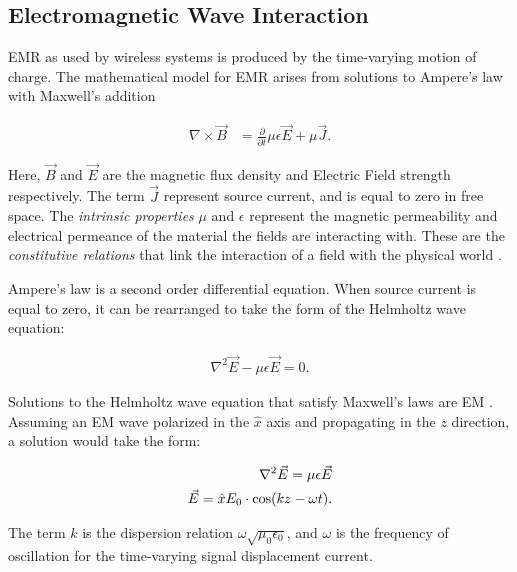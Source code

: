 	\subsection{Electromagnetic Wave Interaction}
	\label{sec:EM}

		\gls{EMR} as used by wireless systems is produced by the time-varying motion of charge. The mathematical model for EMR arises from solutions to Ampere's law with Maxwell's addition

		\begin{align}
			\nabla \times \vec{B} &= \frac{\partial}{\partial t} \mu \epsilon \vec{E} + \mu \vec{J} \label{eq:AMP}.
		\end{align}

		Here, $\vec{B}$ and $\vec{E}$ are the magnetic flux density and Electric Field strength respectively. The term $\vec{J}$ represent source current, and is equal to zero in free space. The \textit{intrinsic properties} $\mu$ and $\epsilon$ represent the magnetic permeability and electrical permeance of the material the fields are interacting with. These are the \textit{constitutive relations} that link the interaction of a field with the physical world \cite{KONG}.

		Ampere's law is a second order differential equation. When source current is equal to zero, it can be rearranged to take the form of the Helmholtz wave equation:

		\begin{align}
			\nabla^2 \vec E - \mu \epsilon \vec{E} = 0 \label{eq:helm_wave}.
		\end{align}

		Solutions to the Helmholtz wave equation that satisfy Maxwell's laws are \gls{EM} \cite{KONG}. Assuming an EM wave polarized in the $\hat{x}$ axis and propagating in the $z$ direction, a solution would take the form:

		\begin{align}\label{eq:wave_sol}
			\nabla^2 \vec E   = \mu \epsilon \vec{E} \notag\\
			\vec{E} = \hat{x}E_0\cdot \cos(kz - \omega t).
		\end{align}

		The term $k$ is the dispersion relation $\omega\sqrt{\mu_0 \epsilon_0}$, and $\omega$ is the frequency of oscillation for the time-varying signal displacement current.

